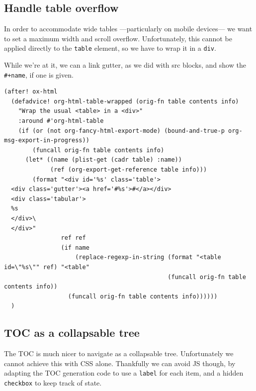\documentclass[11pt]{article}
\begin{document}
\subsection{Handle table overflow}
\label{sec:org4e95313}

In order to accommodate wide tables ---particularly on mobile devices--- we want
to set a maximum width and scroll overflow. Unfortunately, this cannot be applied
directly to the \texttt{table} element, so we have to wrap it in a \texttt{div}.

While we're at it, we can a link gutter, as we did with src blocks, and show the
\texttt{\#+name}, if one is given.

\begin{verbatim}
(after! ox-html
  (defadvice! org-html-table-wrapped (orig-fn table contents info)
    "Wrap the usual <table> in a <div>"
    :around #'org-html-table
    (if (or (not org-fancy-html-export-mode) (bound-and-true-p org-msg-export-in-progress))
        (funcall orig-fn table contents info)
      (let* ((name (plist-get (cadr table) :name))
             (ref (org-export-get-reference table info)))
        (format "<div id='%s' class='table'>
  <div class='gutter'><a href='#%s'>#</a></div>
  <div class='tabular'>
  %s
  </div>\
  </div>"
                ref ref
                (if name
                    (replace-regexp-in-string (format "<table id=\"%s\"" ref) "<table"
                                              (funcall orig-fn table contents info))
                  (funcall orig-fn table contents info))))))
  )
\end{verbatim}
\subsection{TOC as a collapsable tree}
\label{sec:org7ce0c12}

The TOC is much nicer to navigate as a collapsable tree. Unfortunately we cannot
achieve this with CSS alone. Thankfully we can avoid JS though, by adapting the
TOC generation code to use a \texttt{label} for each item, and a hidden \texttt{checkbox} to keep
track of state.
\end{document}
